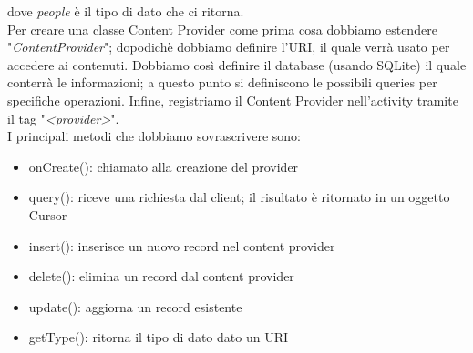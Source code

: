 dove \textit{people} è il tipo di dato che ci ritorna.\\
Per creare una classe Content Provider come prima cosa dobbiamo estendere
"\textit{ContentProvider}"; dopodichè dobbiamo definire l'URI, il quale verrà
usato per accedere ai contenuti. Dobbiamo così definire il database (usando
SQLite) il quale conterrà le informazioni; a questo punto si definiscono le
possibili queries per specifiche operazioni. Infine, registriamo il Content
Provider nell'activity tramite il tag "\textit{<provider>}".\\
I principali metodi che dobbiamo sovrascrivere sono:
\begin{itemize}
    \item onCreate(): chiamato alla creazione del provider
    \item query(): riceve una richiesta dal client; il risultato è ritornato in
un oggetto Cursor
    \item insert(): inserisce un nuovo record nel content provider
    \item delete(): elimina un record dal content provider
    \item update(): aggiorna un record esistente
    \item getType(): ritorna il tipo di dato dato un URI
\end{itemize}
% 
